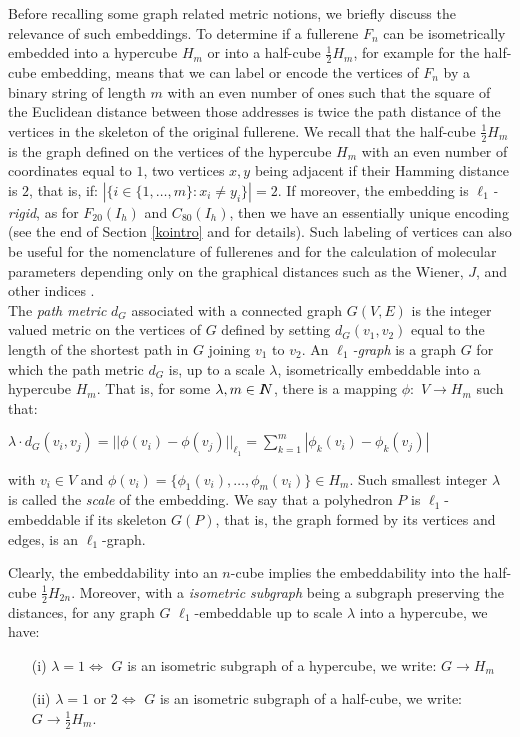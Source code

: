 \noindent
Before recalling some graph related metric notions,  we briefly discuss the relevance of such embeddings. To determine if
a fullerene $F_n$ can be isometrically embedded into a hypercube $H_m$ or into a half-cube $\frac{1}{2}H_m$,
for example for the half-cube embedding, means that  we can label or encode the vertices of $F_n$ by a binary string 
of length $m$ with an even number of ones such that the square of the Euclidean distance 
between those addresses is twice
the path distance of the vertices in the skeleton of the original fullerene. 
We recall that the half-cube $\frac{1}{2} H_m$ is the graph defined on the
vertices of the hypercube $H_m$ with an even number of coordinates equal to $1$,
two vertices $x,y$ being adjacent if their Hamming distance is $2$, that
is, if: ${\displaystyle |\{i\in\{1,\dots,m\}:x_i\neq y_i\}|=2}$.
If moreover, the embedding is {\em $\ell_1$-rigid},
as for $F_{20}(I_h)$ and $C_{80}(I_h)$,
then we have an essentially unique encoding 
(see the end of Section \ref{kointro} and \cite{dl96} for details). 
Such labeling of vertices can 
also be useful for the nomenclature of fullerenes \cite{e95}
and for the calculation of molecular parameters depending only on the 
graphical distances such as the Wiener, $J$, and other indices \cite{bala95}.\\ 

The {\em path metric} $d_G$ associated with a connected graph $G(V,E)$ is the integer valued metric
on the vertices of $G$ defined by setting $d_G(v_1,v_2)$ equal to the length of the shortest path in $G$
joining $v_1$ to $v_2$. 
An {\em $\ell_1$-graph} is a graph $G$ for which the path metric $d_G$ is, up to a scale $\lambda$, isometrically 
embeddable 
into a hypercube $H_m$. That is, for some $\lambda,m\in I\hspace{-1.5mm}N$, there is a mapping
$\phi:$ $V\rightarrow H_m$ such that:
\begin{center}
${\displaystyle \lambda\cdot d_G(v_i,v_j)=||\phi(v_i)-\phi(v_j)||_{\ell_1}=\sum_{k=1}^{m}|\phi_{k}(v_i)-\phi_{k}(v_j)|}$
\end{center}
with $v_i\in V$ and $\phi(v_i)=\{\phi_1(v_i),\dots,\phi_m(v_i)\}\in H_m$. Such smallest integer $\lambda$ is called 
the {\em scale} of the embedding. We say that a polyhedron $P$ is $\ell_1$-embeddable 
if its skeleton $G(P)$, that is, the graph formed by its vertices and edges, is an 
$\ell_1$-graph.

Clearly, the embeddability into an $n$-cube implies the embeddability into the half-cube $\frac{1}{2}H_{2n}$.
Moreover, with a {\em isometric subgraph} being a subgraph preserving the distances,
for  any graph $G$ $\ell_1$-embeddable up to scale $\lambda$ into a hypercube, we have:
\begin{enumerate}
\item[(i)] $\lambda=1\Leftrightarrow$ $G$ is an isometric subgraph of a hypercube, 
we write: $G\rightarrow H_m$
\item[(ii)] $\lambda=1$ or $2\Leftrightarrow$ $G$ is an isometric subgraph of a half-cube, we write: $G\rightarrow 
\frac{1}{2} H_m$.
\end{enumerate}

